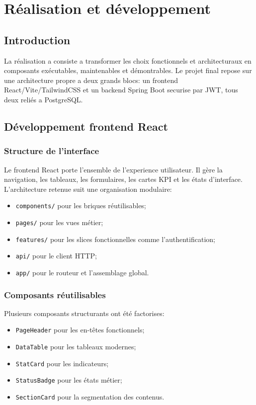 ﻿\documentclass[12pt,a4paper,oneside]{report}
\begin{document}


\chapter{Réalisation et développement}
\label{chap:implementation}

\section{Introduction}
La réalisation a consiste a transformer les choix fonctionnels et architecturaux en composants exécutables, maintenables et démontrables. Le projet final repose sur une architecture propre a deux grands blocs: un frontend React/Vite/TailwindCSS et un backend Spring Boot securise par JWT, tous deux reliés a PostgreSQL.

\section{Développement frontend React}
\subsection{Structure de l'interface}
Le frontend React porte l'ensemble de l'experience utilisateur. Il gère la navigation, les tableaux, les formulaires, les cartes KPI et les états d'interface. L'architecture retenue suit une organisation modulaire:
\begin{itemize}
  \item \texttt{components/} pour les briques réutilisables;
  \item \texttt{pages/} pour les vues métier;
  \item \texttt{features/} pour les slices fonctionnelles comme l'authentification;
  \item \texttt{api/} pour le client HTTP;
  \item \texttt{app/} pour le routeur et l'assemblage global.
\end{itemize}

\subsection{Composants réutilisables}
Plusieurs composants structurants ont été factorises:
\begin{itemize}
  \item \texttt{PageHeader} pour les en-têtes fonctionnels;
  \item \texttt{DataTable} pour les tableaux modernes;
  \item \texttt{StatCard} pour les indicateurs;
  \item \texttt{StatusBadge} pour les états métier;
  \item \texttt{SectionCard} pour la segmentation des contenus.
\end{itemize}
\end{document}
